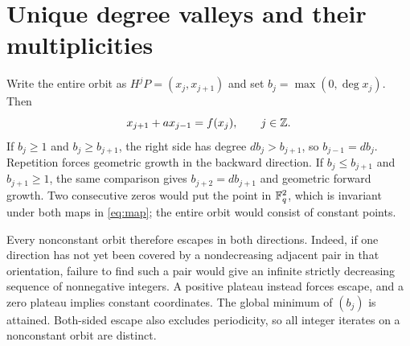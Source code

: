 \section{Unique degree valleys and their multiplicities}\label{sec:valleys}
Write the entire orbit as $H^jP=(x_j,x_{j+1})$ and set
$b_j=\max(0,\deg x_j)$. Then
\begin{equation}\label{eq:recurrence}
 x_{j+1}+a x_{j-1}=f(x_j),\qquad j\in\mathbb Z.
\end{equation}
If $b_j\ge1$ and $b_j\ge b_{j+1}$, the right side has degree
$db_j>b_{j+1}$, so $b_{j-1}=db_j$. Repetition forces geometric
growth in the backward direction. If $b_j\le b_{j+1}$ and
$b_{j+1}\ge1$, the same comparison gives $b_{j+2}=db_{j+1}$
and geometric forward growth. Two consecutive zeros would put the
point in $\mathbb F_q^2$, which is invariant under both maps in
\eqref{eq:map}; the entire orbit would consist of constant points.

Every nonconstant orbit therefore escapes in both directions.
Indeed, if one direction has not yet been covered by a nondecreasing
adjacent pair in that orientation, failure to find such a pair would
give an infinite strictly decreasing sequence of nonnegative integers.
A positive plateau instead forces escape, and a zero plateau implies
constant coordinates. The global minimum of $(b_j)$ is attained.
Both-sided escape also excludes periodicity, so all integer iterates
on a nonconstant orbit are distinct.

